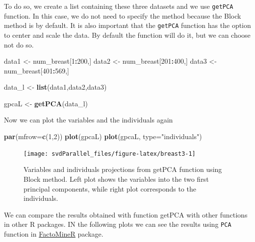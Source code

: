 \documentclass[]{article}
\newenvironment{Shaded}{\begin{snugshade}}{\end{snugshade}}
\newcommand{\KeywordTok}[1]{\textcolor[rgb]{0.13,0.29,0.53}{\textbf{#1}}}
\newcommand{\DataTypeTok}[1]{\textcolor[rgb]{0.13,0.29,0.53}{#1}}
\newcommand{\DecValTok}[1]{\textcolor[rgb]{0.00,0.00,0.81}{#1}}
\newcommand{\StringTok}[1]{\textcolor[rgb]{0.31,0.60,0.02}{#1}}
\newcommand{\OperatorTok}[1]{\textcolor[rgb]{0.81,0.36,0.00}{\textbf{#1}}}
\newcommand{\NormalTok}[1]{#1}
\begin{document}
To do so, we create a list containing these three datasets and we use
\texttt{getPCA} function. In this case, we do not need to specify the
method because the Block method is by default. It is also important that
the \texttt{getPCA} function has the option to center and scale the
data. By default the function will do it, but we can choose not do so.

\begin{Shaded}
\begin{Highlighting}[]
\NormalTok{data1 <-}\StringTok{ }\NormalTok{num_breast[}\DecValTok{1}\OperatorTok{:}\DecValTok{200}\NormalTok{,]}
\NormalTok{data2 <-}\StringTok{ }\NormalTok{num_breast[}\DecValTok{201}\OperatorTok{:}\DecValTok{400}\NormalTok{,]}
\NormalTok{data3 <-}\StringTok{ }\NormalTok{num_breast[}\DecValTok{401}\OperatorTok{:}\DecValTok{569}\NormalTok{,]}

\NormalTok{data_l <-}\StringTok{ }\KeywordTok{list}\NormalTok{(data1,data2,data3)}

\NormalTok{gpcaL <-}\StringTok{ }\KeywordTok{getPCA}\NormalTok{(data_l)}
\end{Highlighting}
\end{Shaded}

Now we can plot the variables and the individuals again

\begin{Shaded}
\begin{Highlighting}[]

\KeywordTok{par}\NormalTok{(}\DataTypeTok{mfrow=}\KeywordTok{c}\NormalTok{(}\DecValTok{1}\NormalTok{,}\DecValTok{2}\NormalTok{))}
\KeywordTok{plot}\NormalTok{(gpcaL)}
\KeywordTok{plot}\NormalTok{(gpcaL, }\DataTypeTok{type=}\StringTok{"individuals"}\NormalTok{)}
\end{Highlighting}
\end{Shaded}

\begin{figure}

{\centering \texttt{[image: svdParallel\_files/figure-latex/breast3-1]} 

}

\caption{Variables and individuals projections from getPCA function using Block method. Left plot shows the variables into the two first principal components, while right plot corresponds to the individuals.}\label{fig:breast3}
\end{figure}

We can compare the results obtained with function getPCA with other
functions in other R packages. IN the following plots we can see the
results using \texttt{PCA} function in
\href{https://www.rdocumentation.org/packages/FactoMineR}{FactoMineR}
package.
\end{document}
